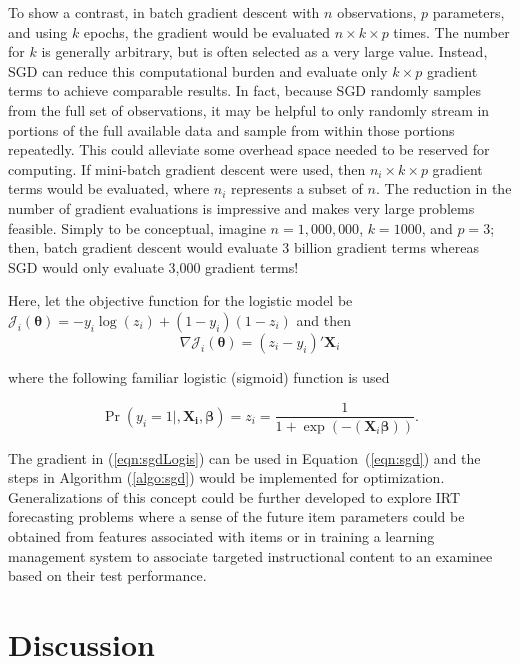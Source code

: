 \documentclass[12pt]{article}
\begin{document}
To show a contrast, in batch gradient descent with $n$ observations, $p$ parameters, and using $k$ epochs, the gradient would be evaluated $n \times k \times p$ times. The number for $k$ is generally arbitrary, but is often selected as a very large value. Instead, SGD can reduce this computational burden and evaluate only $k \times p$ gradient terms to achieve comparable results. In fact, because SGD randomly samples from the full set of observations, it may be helpful to only randomly stream in portions of the full available data and sample from within those portions repeatedly. This could alleviate some overhead space needed to be reserved for computing. If mini-batch gradient descent were used, then $n_i \times k \times p$ gradient terms would be evaluated, where $n_i$ represents a subset of $n$. The reduction in the number of gradient evaluations is impressive and makes very large problems feasible. Simply to be conceptual, imagine $n=1,000,000$, $k=1000$, and $p=3$; then, batch gradient descent would evaluate 3 billion gradient terms whereas SGD would only evaluate 3,000 gradient terms!

Here, let the objective function for the logistic model be $\mathcal{J}_i(\bm{\theta}) = -y_i\log(z_i) + (1 - y_i)(1-z_i)$ and then 
\begin{equation}
\label{eqn:sgdLogis}
\nabla\mathcal{J}_i(\bm{\theta}) = (z_i - y_i)'\bm{X}_i
\end{equation}

\noindent where the following familiar logistic (sigmoid) function is used

\begin{equation}
\Pr(y_i=1|,\bm{\bm{X}_i,\beta}) = z_i = \frac{1}{1 + \exp(-(\bm{X}_i\bm{\beta}))}.
\end{equation}

The gradient in (\ref{eqn:sgdLogis}) can be used in Equation~(\ref{eqn:sgd}) and the steps in Algorithm (\ref{algo:sgd}) would be implemented for optimization. Generalizations of this concept could be further developed to explore IRT forecasting problems where a sense of the future item parameters could be obtained from features associated with items or in training a learning management system to associate targeted instructional content to an examinee based on their test performance.   

\section*{Discussion}
\end{document}

